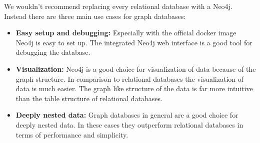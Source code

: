 We wouldn't recommend replacing every relational database with a Neo4j.
Instead there are three main use cases for graph databases:
\begin{itemize}
      \item \textbf{Easy setup and debugging:} Especially with the official docker
            image Neo4j is easy to set up. The integrated Neo4j web interface is a good tool for
            debugging the database.
      \item \textbf{Visualization:} Neo4j is a good choice for visualization of data
            because of the graph structure. In comparison to relational databases the
            visualization of data is much easier. The graph like structure of the data is
            far more intuitive than the table structure of relational databases.
      \item \textbf{Deeply nested data:} Graph databases in general are a good choice
            for deeply nested data. In these cases they outperform relational databases in
            terms of performance and simplicity.
\end{itemize}
